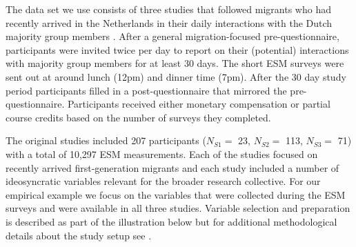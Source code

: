 The data set we use consists of three studies that followed migrants who
had recently arrived in the Netherlands in their daily interactions with
the Dutch majority group members
\citep[for the data set see][]{Kreienkamp2022b}. After a general
migration-focused pre-questionnaire, participants were invited twice per
day to report on their (potential) interactions with majority group
members for at least 30 days. The short ESM surveys were sent out at
around lunch (12pm) and dinner time (7pm). After the 30 day study period
participants filled in a post-questionnaire that mirrored the
pre-questionnaire. Participants received either monetary compensation or
partial course credits based on the number of surveys they completed.

The original studies included 207 participants (\(N_{S1}=\) 23,
\(N_{S2}=\) 113, \(N_{S3}=\) 71) with a total of 10,297 ESM
measurements. Each of the studies focused on recently arrived
first-generation migrants and each study included a number of
ideosyncratic variables relevant for the broader research collective.
For our empirical example we focus on the variables that were collected
during the ESM surveys and were available in all three studies. Variable
selection and preparation is described as part of the illustration below
but for additional methodological details about the study setup see
\citet[][]{Kreienkamp2022b}.

